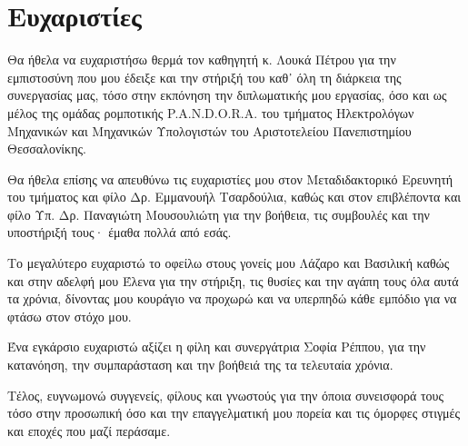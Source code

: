 \section*{Ευχαριστίες}
{}


Θα ήθελα να ευχαριστήσω θερμά τον καθηγητή κ. Λουκά Πέτρου
για την εμπιστοσύνη που μου έδειξε και την στήριξή του καθ᾽ όλη τη
διάρκεια της συνεργασίας μας, τόσο στην εκπόνηση την διπλωματικής
μου εργασίας, όσο και ως μέλος της ομάδας ρομποτικής P.A.N.D.O.R.A. του
τμήματος Ηλεκτρολόγων Μηχανικών και Μηχανικών Υπολογιστών
του Αριστοτελείου Πανεπιστημίου Θεσσαλονίκης.

Θα ήθελα επίσης να απευθύνω τις ευχαριστίες μου στον Μεταδιδακτορικό
Ερευνητή του τμήματος και φίλο Δρ. Εμμανουήλ Τσαρδούλια, καθώς και στον επιβλέποντα
και φίλο Υπ. Δρ. Παναγιώτη Μουσουλιώτη για την βοήθεια, τις συμβουλές και
την υποστήριξή τους· έμαθα πολλά από εσάς.

Το μεγαλύτερο ευχαριστώ το οφείλω στους γονείς μου Λάζαρο και Βασιλική καθώς
και στην αδελφή μου Έλενα για την στήριξη, τις θυσίες και την αγάπη τους όλα αυτά
τα χρόνια, δίνοντας μου κουράγιο να προχωρώ και να υπερπηδώ κάθε εμπόδιο
για να φτάσω στον στόχο μου.

Ένα εγκάρσιο ευχαριστώ αξίζει η φίλη και συνεργάτρια Σοφία Ρέππου,
για την κατανόηση, την συμπαράσταση και την βοήθειά της τα τελευταία
χρόνια.

Τέλος, ευγνωμονώ συγγενείς, φίλους και γνωστούς για την όποια
συνεισφορά τους τόσο στην προσωπική όσο και την επαγγελματική μου πορεία
και τις όμορφες στιγμές και εποχές που μαζί περάσαμε.
